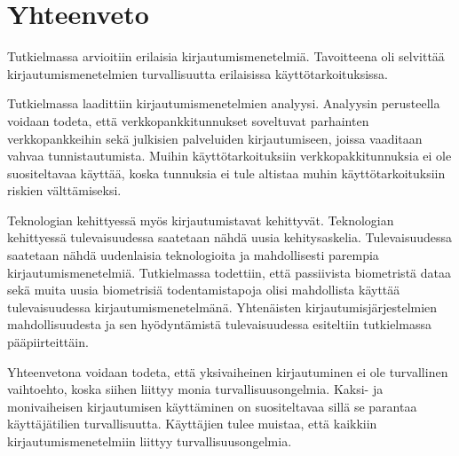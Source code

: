 \chapter{Yhteenveto\label{yhteenveto}}

Tutkielmassa arvioitiin erilaisia kirjautumismenetelmiä. Tavoitteena oli selvittää kirjautumismenetelmien turvallisuutta erilaisissa käyttötarkoituksissa.

Tutkielmassa laadittiin kirjautumismenetelmien analyysi. Analyysin perusteella voidaan todeta, että verkkopankkitunnukset soveltuvat parhainten verkkopankkeihin sekä julkisien palveluiden kirjautumiseen, joissa vaaditaan vahvaa tunnistautumista. Muihin käyttötarkoituksiin verkkopakkitunnuksia ei ole suositeltavaa käyttää, koska tunnuksia ei tule altistaa muhin käyttötarkoituksiin riskien välttämiseksi.

Teknologian kehittyessä myös kirjautumistavat kehittyvät. Teknologian kehittyessä tulevaisuudessa saatetaan nähdä uusia kehitysaskelia. Tulevaisuudessa saatetaan nähdä uudenlaisia teknologioita ja mahdollisesti parempia kirjautumismenetelmiä. Tutkielmassa todettiin, että passiivista biometristä dataa sekä muita uusia biometrisiä todentamistapoja olisi mahdollista käyttää tulevaisuudessa kirjautumismenetelmänä. Yhtenäisten kirjautumisjärjestelmien mahdollisuudesta ja sen hyödyntämistä tulevaisuudessa esiteltiin tutkielmassa pääpiirteittäin. 

Yhteenvetona voidaan todeta, että yksivaiheinen kirjautuminen ei ole turvallinen vaihtoehto, koska siihen liittyy monia turvallisuusongelmia. Kaksi- ja monivaiheisen kirjautumisen käyttäminen on suositeltavaa sillä se parantaa käyttäjätilien turvallisuutta. Käyttäjien tulee muistaa, että kaikkiin kirjautumismenetelmiin liittyy turvallisuusongelmia. 
